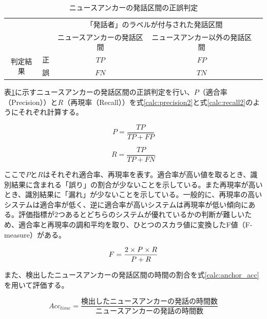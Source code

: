 \begin{table}[H]
\begin{center}
    \caption{ニュースアンカーの発話区間の正誤判定 \label{table:clustering}}
\begin{tabular}{|c|c|c|c|l}
\cline{1-4}
\multicolumn{2}{|c|}{\multirow{2}{*}{}} & \multicolumn{2}{c|}{「発話者」のラベルが付与された発話区間} &  \\ \cline{3-4}
\multicolumn{2}{|c|}{}                  & ニュースアンカーの発話区間        & ニュースアンカー以外の発話区間        &  \\ \cline{1-4}
\multirow{2}{*}{判定結果}        & 正        & $TP$                  & $FP$                   &  \\ \cline{2-4}
& 誤        & $FN$                  & $TN$                   &  \\ \cline{1-4}
\end{tabular}
\end{center}
\end{table}

表\ref{table:clustering}に示すニュースアンカーの発話区間の正誤判定を行い、$P$（適合率（Precision））と$R$（再現率（Recall））を式\ref{calc:precision2}と式\ref{calc:recall2}のようにそれぞれ計算する。

\begin{equation}
\label{calc:precision2}
P = \frac{TP}{TP + FP}
\end{equation}

\begin{equation}
\label{calc:recall2}
R = \frac{TP}{TP + FN}
\end{equation}

ここで$P$と$R$はそれぞれ適合率、再現率を表す。適合率が高い値を取るとき、識別結果に含まれる「誤り」の割合が少ないことを示している。また再現率が高いとき、識別結果に「漏れ」が少ないことを示している。一般的に、再現率の高いシステムは適合率が低く、逆に適合率が高いシステムは再現率が低い傾向にある。評価指標が2つあるとどちらのシステムが優れているかの判断が難しいため、適合率と再現率の調和平均を取り、ひとつのスカラ値に変換したF値（F-measure）がある。

\begin{equation}
\label{calc:fmeasure}
F = \frac{2 \times P \times R}{P + R} \notag
\end{equation}

また、検出したニュースアンカーの発話区間の時間の割合を式\ref{calc:anchor_acc}を用いて評価する。

\begin{equation}
\label{calc:anchor_acc}
Acc_{time} = \frac{検出したニュースアンカーの発話の時間数}{ニュースアンカーの発話の時間数}
\end{equation}

